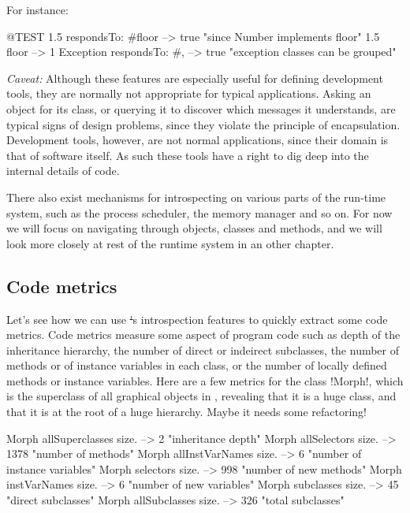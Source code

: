 \documentclass[a4paper,10pt,twoside]{book}
\begin{document}
For instance:
\begin{code}{@TEST}
1.5 respondsTo: #floor      --> true    "since Number implements floor"
1.5 floor                            --> 1
Exception respondsTo: #, --> true    "exception classes can be grouped"
\end{code}

\emph{Caveat:} Although these features are especially useful for defining development tools, they are normally not appropriate for typical applications.
Asking an object for its class, or querying it to discover which messages it understands, are typical signs of design problems, since they violate the principle of encapsulation.
Development tools, however, are not normal applications, since their domain is that of software itself. As such these tools have a right to dig deep into the internal details of code.

There also exist mechanisms for introspecting on various parts of the run-time system, such as  the process scheduler, the memory manager and so on. For now we will focus on navigating through objects, classes and methods, and we will look more closely at rest of the runtime system in an other chapter.

\subsection{Code metrics}

Let's see how we can use \st's introspection features to quickly extract some code metrics.
Code metrics measure some aspect of program code such as depth of the inheritance hierarchy, the number of direct or indeirect subclasses, the number of methods or of instance variables in each class, or the number of locally defined methods or instance variables.
Here are a few metrics for the class \ct!Morph!, which is the superclass of all graphical objects in \pharo, revealing that it is a huge class, and that it is at the root of a huge hierarchy. Maybe it needs some refactoring!

\begin{code}{}
Morph allSuperclasses size.  -->       2 "inheritance depth"
Morph allSelectors size.        --> 1378 "number of methods"
Morph allInstVarNames size. -->      6 "number of instance variables"
Morph selectors size.             -->  998 "number of new methods"
Morph instVarNames size.     -->      6 "number of new variables"
Morph subclasses size.          -->    45 "direct subclasses"
Morph allSubclasses size.      -->  326 "total subclasses"
\end{code}
\end{document}
